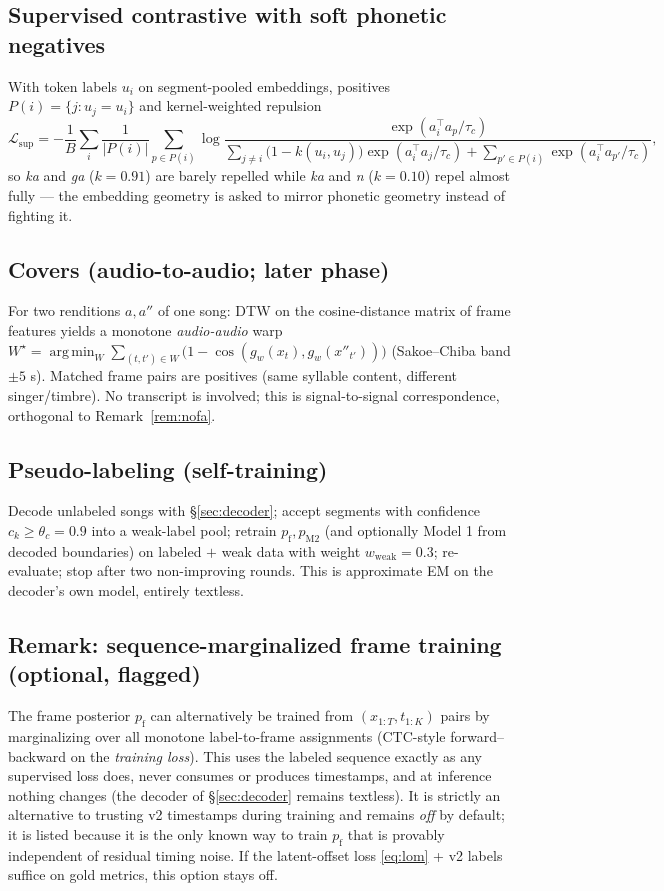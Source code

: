 \documentclass[10pt]{article}
\DeclareMathOperator*{\argmin}{arg\,min}
\begin{document}
\subsection{Supervised contrastive with soft phonetic negatives}
With token labels $u_i$ on segment-pooled embeddings, positives $P(i) = \{j : u_j = u_i\}$ and kernel-weighted repulsion
\begin{equation}
\mathcal{L}_{\mathrm{sup}} = -\frac{1}{B}\sum_i \frac{1}{|P(i)|}\sum_{p \in P(i)} \log
\frac{\exp(a_i^\top a_p/\tau_c)}{\sum_{j \ne i} \big(1 - k(u_i, u_j)\big) \exp(a_i^\top a_j/\tau_c) + \sum_{p' \in P(i)} \exp(a_i^\top a_{p'}/\tau_c)},
\end{equation}
so \emph{ka} and \emph{ga} ($k = 0.91$) are barely repelled while \emph{ka} and \emph{n} ($k = 0.10$) repel almost fully --- the embedding geometry is asked to mirror phonetic geometry instead of fighting it.

\subsection{Covers (audio-to-audio; later phase)}
For two renditions $a, a''$ of one song: DTW on the cosine-distance matrix of frame features yields a monotone \emph{audio-audio} warp $W^\star = \argmin_W \sum_{(t,t') \in W} \big(1 - \cos(g_w(x_t), g_w(x''_{t'}))\big)$ (Sakoe--Chiba band $\pm 5$ s). Matched frame pairs are positives (same syllable content, different singer/timbre). No transcript is involved; this is signal-to-signal correspondence, orthogonal to Remark~\ref{rem:nofa}.

\subsection{Pseudo-labeling (self-training)}
Decode unlabeled songs with \S\ref{sec:decoder}; accept segments with confidence $c_k \ge \theta_c = 0.9$ into a weak-label pool; retrain $p_{\mathrm{f}}, p_{\mathrm{M2}}$ (and optionally Model 1 from decoded boundaries) on labeled $+$ weak data with weight $w_{\mathrm{weak}} = 0.3$; re-evaluate; stop after two non-improving rounds. This is approximate EM on the decoder's own model, entirely textless.

\subsection{Remark: sequence-marginalized frame training (optional, flagged)}
The frame posterior $p_{\mathrm{f}}$ can alternatively be trained from $(x_{1:T}, t_{1:K})$ pairs by marginalizing over all monotone label-to-frame assignments (CTC-style forward--backward on the \emph{training loss}). This uses the labeled sequence exactly as any supervised loss does, never consumes or produces timestamps, and at inference nothing changes (the decoder of \S\ref{sec:decoder} remains textless). It is strictly an alternative to trusting v2 timestamps during training and remains \emph{off} by default; it is listed because it is the only known way to train $p_{\mathrm{f}}$ that is provably independent of residual timing noise. If the latent-offset loss \eqref{eq:lom} + v2 labels suffice on gold metrics, this option stays off.
\end{document}
